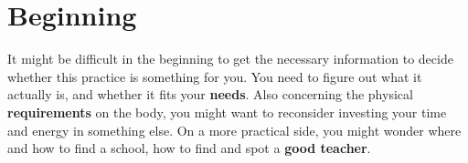 \chapter{Beginning}\label{ch:beginning}


It might be difficult in the beginning to get the necessary information to decide whether this practice is something for you.
You need to figure out what it actually is, and whether it fits your \textbf{needs}.
Also concerning the physical \textbf{requirements} on the body, you might want to reconsider investing your time and energy in something else.
On a more practical side, you might wonder where and how to find a school, how to find and spot a \textbf{good teacher}.





